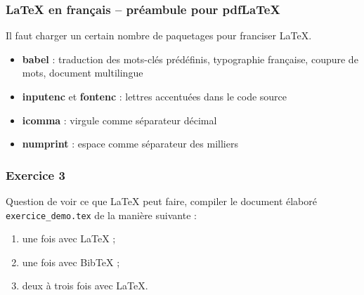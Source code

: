 \begin{frame}[fragile]

	\frametitle{{\LaTeX} en français -- préambule pour pdf\LaTeX}
	
	Il faut charger un certain nombre de paquetages pour franciser {\LaTeX}.
	
	\begin{codesource}
	\documentclass[french]{memoir}
	\usepackage{babel}
	\usepackage[autolanguage]{numprint}
	\usepackage[utf8]{inputenc}
	\usepackage[T1]{fontenc}
	\usepackage{icomma}
	\end{codesource}

	\pause
	
	\begin{itemize}
		\item \textbf{babel} : traduction des mots-clés prédéfinis, typographie française, coupure de mots, document multilingue
		
		\pause
		
		\item \textbf{inputenc} et \textbf{fontenc} : lettres accentuées dans le code source
		
		\pause
		
		\item \textbf{icomma} : virgule comme séparateur décimal
		
		\pause
		
		\item \textbf{numprint} : espace comme séparateur des milliers
	\end{itemize}
\end{frame}


\begin{frame}[c]

\frametitle{Exercice 3}

Question de voir ce que {\LaTeX} peut faire, compiler le document élaboré
\texttt{exercice\_demo.tex} de la manière suivante :

\begin{enumerate}
	\item une fois avec LaTeX ;
	\item une fois avec BibTeX ;
	\item deux à trois fois avec LaTeX.
\end{enumerate}

\end{frame}



